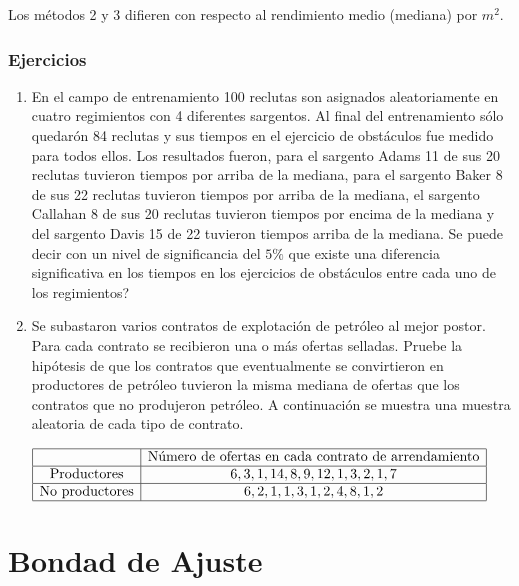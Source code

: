 \documentclass[
  a4paper,
  oneside,
  openany]{book}
\begin{document}
Los métodos 2 y 3 difieren con respecto al rendimiento medio (mediana) por \(m^2\).

\hypertarget{ejercicios-9}{%
\section{Ejercicios}\label{ejercicios-9}}

\begin{enumerate}
\def\labelenumi{\arabic{enumi}.}
\item
  En el campo de entrenamiento 100 reclutas son asignados aleatoriamente en cuatro regimientos con 4 diferentes sargentos. Al final del entrenamiento sólo quedarón 84 reclutas y sus tiempos en el ejercicio de obstáculos fue medido para todos ellos. Los resultados fueron, para el sargento Adams 11 de sus 20 reclutas tuvieron tiempos por arriba de la mediana, para el sargento Baker 8 de sus 22 reclutas tuvieron tiempos por arriba de la mediana, el sargento Callahan 8 de sus 20 reclutas tuvieron tiempos por encima de la mediana y del sargento Davis 15 de 22 tuvieron tiempos arriba de la mediana. Se puede decir con un nivel de significancia del \(5\%\) que existe una diferencia significativa en los tiempos en los ejercicios de obstáculos entre cada uno de los regimientos?
\item
  Se subastaron varios contratos de explotación de petróleo al mejor postor. Para cada contrato se recibieron una o más ofertas selladas. Pruebe la hipótesis de que los contratos que eventualmente se convirtieron en productores de petróleo tuvieron la misma mediana de ofertas que los contratos que no produjeron petróleo. A continuación se muestra una muestra aleatoria de cada tipo de contrato.
\end{enumerate}

\[
\begin{array}{|c | c |}
\hline
&\mbox{Número de ofertas en cada contrato de arrendamiento} \\
   \hline
\mbox{Productores}& 6, 3, 1, 14, 8, 9, 12, 1, 3, 2, 1, 7  \\
  \hline
\mbox{No  productores}&6, 2, 1, 1, 3, 1, 2, 4, 8, 1, 2\\
    \hline
\end{array}
\]

\hypertarget{part-bondad-de-ajuste}{%
\part{Bondad de Ajuste}\label{part-bondad-de-ajuste}}
\end{document}
